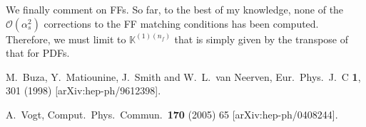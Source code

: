 \documentclass[10pt,a4paper]{article}
\begin{document}
\newpage

We finally comment on FFs. So far, to the best of my knowledge, none
of the $\mathcal{O}(\alpha_s^2)$ corrections to the FF matching
conditions has been computed. Therefore, we must limit to
$\mathbb{K}^{(1)(n_f)}$ that is simply given by the transpose of that
for PDFs.

\newpage
\begin{thebibliography}{alp}

  M.~Buza, Y.~Matiounine, J.~Smith and W.~L.~van Neerven,
  Eur.\ Phys.\ J.\  C {\bf 1}, 301 (1998)
  [arXiv:hep-ph/9612398].

  A.~Vogt,
  Comput.\ Phys.\ Commun.\  {\bf 170} (2005) 65
  [arXiv:hep-ph/0408244].

\end{thebibliography}
\end{document}
